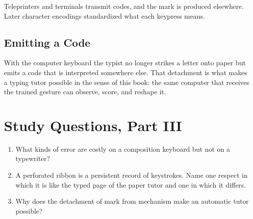 Teleprinters and terminals transmit codes, and the mark is produced elsewhere. Later character encodings standardized what each keypress means. 

\section{Emitting a Code}

With the computer keyboard the typist no longer strikes a letter onto paper but emits a code that is interpreted somewhere else. That detachment is what makes a typing tutor possible in the sense of this book: the same computer that receives the trained gesture can observe, score, and reshape it.

\chapter*{Study Questions, Part III}
\begin{enumerate}
\item What kinds of error are costly on a composition keyboard but not on a typewriter?
\item A perforated ribbon is a persistent record of keystrokes. Name one respect in which it is like the typed page of the paper tutor and one in which it differs.
\item Why does the detachment of mark from mechanism make an automatic tutor possible?
\end{enumerate}
